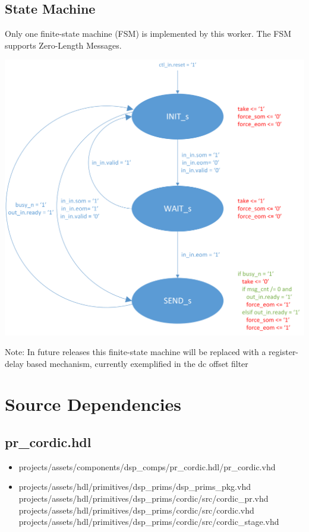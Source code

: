 \documentclass{article}
\def\comp{pr\_cordic}
\begin{document}
	\subsection*{State Machine}
	\begin{flushleft}
		Only one finite-state machine (FSM) is implemented by this worker. The FSM supports Zero-Length Messages.
	\end{flushleft}
	{\centering\captionsetup{type=figure}\includegraphics[scale=0.6]{zlm_fsm}\par{}\label{fig:zlm_fsm}}
        \begin{flushleft}
                Note: In future releases this finite-state machine will be replaced with a register-delay based mechanism, currently exemplified in the dc offset filter
        \end{flushleft}


\section*{Source Dependencies}
\subsection*{\comp.hdl}
\begin{itemize}
	\item projects/assets/components/dsp\_comps/pr\_cordic.hdl/pr\_cordic.vhd
	\item projects/assets/hdl/primitives/dsp\_prims/dsp\_prims\_pkg.vhd
	      \subitem projects/assets/hdl/primitives/dsp\_prims/cordic/src/cordic\_pr.vhd
	      \subitem projects/assets/hdl/primitives/dsp\_prims/cordic/src/cordic.vhd
	      \subitem projects/assets/hdl/primitives/dsp\_prims/cordic/src/cordic\_stage.vhd
\end{itemize}
\end{document}
